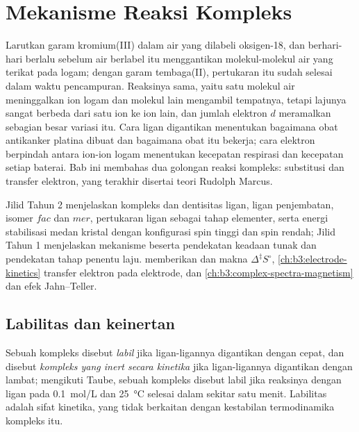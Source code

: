 \chapter{Mekanisme Reaksi Kompleks}\label{ch:b3:complex-mechanisms}

Larutkan garam kromium(III) dalam air yang dilabeli oksigen-18, dan berhari-hari
berlalu sebelum air berlabel itu menggantikan molekul-molekul air yang terikat
pada logam; dengan garam tembaga(II), pertukaran itu sudah selesai dalam
waktu pencampuran. Reaksinya sama, yaitu satu molekul air meninggalkan ion
logam dan molekul lain mengambil tempatnya, tetapi lajunya sangat berbeda
dari satu ion ke ion lain, dan jumlah elektron $d$ meramalkan sebagian besar
variasi itu. Cara ligan digantikan menentukan bagaimana obat antikanker
platina dibuat dan bagaimana obat itu bekerja; cara elektron berpindah
antara ion-ion logam menentukan kecepatan respirasi dan kecepatan setiap
baterai. Bab ini membahas dua golongan reaksi kompleks: substitusi dan
transfer elektron, yang terakhir disertai teori Rudolph Marcus.

\begin{recall}
Jilid Tahun 2 menjelaskan kompleks dan dentisitas ligan, ligan penjembatan,
isomer $fac$ dan $mer$, pertukaran ligan sebagai tahap elementer, serta energi
stabilisasi medan kristal dengan konfigurasi spin tinggi dan spin rendah;
Jilid Tahun 1 menjelaskan mekanisme beserta pendekatan keadaan tunak dan
pendekatan tahap penentu laju.  memberikan  dan
makna $\Delta^{\ddagger}S^\circ$, \cref{ch:b3:electrode-kinetics} transfer elektron pada
elektrode, dan \cref{ch:b3:complex-spectra-magnetism}  dan
efek Jahn--Teller.
\end{recall}

\section{Labilitas dan keinertan}

\begin{definition}\label{def:b3:complex-mechanisms:labile}
Sebuah kompleks disebut \emph{labil} jika ligan-ligannya
digantikan dengan cepat, dan disebut \emph{kompleks yang inert secara kinetika}
jika ligan-ligannya digantikan dengan lambat; mengikuti Taube, sebuah kompleks
disebut labil jika reaksinya dengan ligan pada \qty{0.1}{mol/L} dan \qty{25}{\celsius} selesai dalam sekitar
satu menit. Labilitas adalah sifat kinetika, yang tidak berkaitan dengan
kestabilan termodinamika kompleks itu.
\end{definition}

